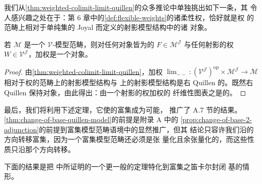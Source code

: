 我们从\cref{thm:weighted-colimit-limit-quillen}的众多推论中单独挑出如下一条，其
令人感兴趣之处在于：第 6 章中的\cref{def:flexible-weights}的诸柔性权，恰好就是权
的范畴上相对于单纯集的 Joyal \trModelStructure{}而定义的射影模型结构中的诸%
\trCofibrant{}对象。

\begin{corollary}\label{cor:flexible-weight-fibrant-limit}
若 $\mathcal{M}$ 是一个 $\mathcal{V}$-模型范畴，则对任何对象皆为\trFibrant{}的%
\trDiagram{} $F\in\mathcal{M}^{\mathcal{J}}$ 与任何射影\trCofibrant{}的权
$W\in\mathcal{V}^{\mathcal{J}}$，加权\trLimit{}是一个\trFibrant{}对象。
\end{corollary}
\begin{proof}
由\cref{thm:weighted-colimit-limit-quillen}，加权\trLimit{}\trBifunctor%
$\operatorname{lim}_{--}\colon(\mathcal{V}^{\mathcal{J}})^{\mathrm{op}}\times\mathcal{M}^{\mathcal{J}}\to\mathcal{M}$ 相对于权的范畴上的射影模型结构与%
\trDiagram{}\trCategory{}上的射影模型结构是右 Quillen 的。既然右 Quillen %
\trBifunctor{}保持\trFibrant{}对象，由此得出：由一个射影\trCofibrant{}的权加权的%
\trPointwise{}纤维性图表之\trLimit{}是\trFibrant{}的。
\end{proof}

最后，我们将利用下述定理，它使\trModelCategory{}的富集\trChangeOfBase{}成为可能，
推广了 A.7 节的结果。\cref{thm:change-of-base-quillen-model}的前提是附录 A 中的%
\cref{prop:change-of-base-2-adjunction}的前提到富集模型范畴语境中的显然推广，但其
结论只容许我们沿\trRightAdjoint{}的方向转移富集，因为一个富集模型范畴还必须是张
量化且余张量化的，而这些性质只沿那个方向转移。

下面的结果是把 \cite[3.8]{bib50} 中所证明的一个更一般的定理特化到富集之笛卡尔封闭
基的情形。

